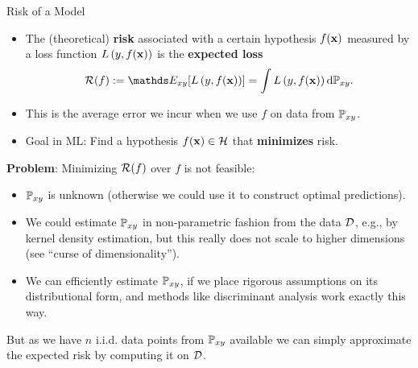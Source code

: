 \documentclass[11pt,compress,t,notes=noshow, xcolor=table]{beamer}
\begin{document}
\begin{vbframe}{Risk of a Model}

\begin{itemize}
  \item The (theoretical) \textbf{risk} associated with a certain hypothesis $f(\mathbf{x})$ measured by a loss function $L\left(y, f(\mathbf{x})\right)$ is the \textbf{expected loss}
  $$ \riskf := \E_{xy} [\Lxy] = \int \Lxy \text{d}\Pxy. $$
  \item This is the average error we incur when we use $f$ on data from $\mathbb{P}_{xy}$.
  \item Goal in ML: Find a hypothesis $f(\mathbf{x}) \in \mathcal{H}$ that \textbf{minimizes} risk.
\end{itemize}

\framebreak


\textbf{Problem}: Minimizing $\mathcal{R}(f)$ over $f$ is not feasible:

\begin{itemize}
\item $\mathbb{P}_{xy}$ is unknown (otherwise we could use it to construct optimal predictions).
\item We could estimate $\mathbb{P}_{xy}$ in non-parametric fashion from the data $\mathcal{D}$, e.g., by kernel density estimation, but this really does not scale to higher dimensions (see \enquote{curse of dimensionality}).
\item We can efficiently estimate $\mathbb{P}_{xy}$, if we place rigorous assumptions on its distributional form, and methods like discriminant analysis work exactly this way.
\end{itemize}

\lz

But as we have $n$ i.i.d. data points from $\mathbb{P}_{xy}$ available we can simply
approximate the expected risk by computing it on $\mathcal{D}$.

\end{vbframe}
\end{document}
